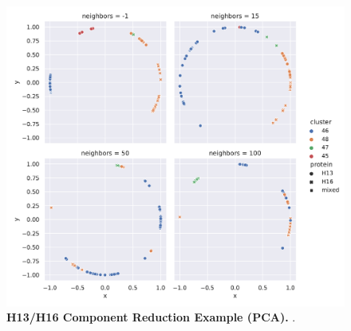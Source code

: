 \begin{figure}[!hbt]
    \centering
    \includegraphics[width=\textwidth]{PCA/Difference_Segment_4_H_metric_cosine.pdf}
    \caption[H13/H16 Component Reduction Example (\Acrshort{PCA})]{\textbf{H13/H16 Component Reduction Example (\Acrshort{PCA}).} .}
    \label{fig:Reduction_Example_PCA}
\end{figure}

